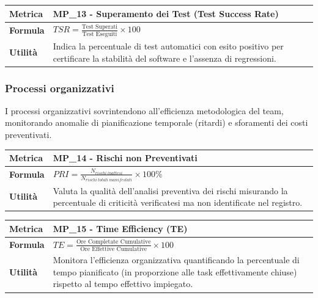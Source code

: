 \documentclass[12pt, a4paper]{article}
\begin{document}
\begin{table}[H]
\centering
\renewcommand{\arraystretch}{1.5}
\begin{tabular}{|l|p{12cm}|}
\hline
\textbf{Metrica} & MP\_13 - Superamento dei Test (Test Success Rate) \\ \hline
\textbf{Formula} & $TSR=\frac{\text{Test Superati}}{\text{Test Eseguiti}}\times 100$ \\ \hline
\textbf{Utilità} & Indica la percentuale di test automatici con esito positivo per certificare la stabilità del software e l'assenza di regressioni. \\ \hline
\end{tabular}
\end{table}

\subsubsection{Processi organizzativi}
I processi organizzativi sovrintendono all'efficienza metodologica del team, monitorando anomalie di pianificazione temporale (ritardi) e sforamenti dei costi preventivati.

\begin{table}[H]
\centering
\renewcommand{\arraystretch}{1.5}
\begin{tabular}{|l|p{12cm}|}
\hline
\textbf{Metrica} & MP\_14 - Rischi non Preventivati \\ \hline
\textbf{Formula} & $PRI=\frac{N_{rischi~inattesi}}{N_{rischi~totali~manifestati}}\times 100\%$ \\ \hline
\textbf{Utilità} & Valuta la qualità dell'analisi preventiva dei rischi misurando la percentuale di criticità verificatesi ma non identificate nel registro. \\ \hline
\end{tabular}
\end{table}

\begin{table}[H]
\centering
\renewcommand{\arraystretch}{1.5}
\begin{tabular}{|l|p{12cm}|}
\hline
\textbf{Metrica} & MP\_15 - Time Efficiency (TE) \\ \hline
\textbf{Formula} & $TE=\frac{\text{Ore Completate Cumulative}}{\text{Ore Effettive Cumulative}} \times 100$ \\ \hline
\textbf{Utilità} & Monitora l'efficienza organizzativa quantificando la percentuale di tempo pianificato (in proporzione alle task effettivamente chiuse) rispetto al tempo effettivo impiegato. \\ \hline
\end{tabular}
\end{table}
\end{document}
